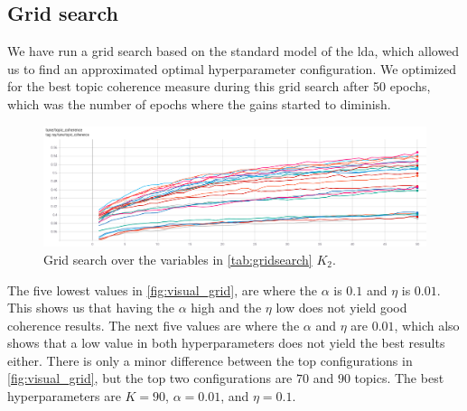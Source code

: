 \subsection{Grid search}\label{sec:appendix_grid_search}
We have run a grid search based on the standard model of the \gls{lda}, which allowed us to find an approximated optimal hyperparameter configuration.
We optimized for the best topic coherence measure during this grid search after 50 epochs, which was the number of epochs where the gains started to diminish.
\begin{figure}
	\includegraphics[width=\textwidth]{figures/gridsearch.png}
	\caption{Grid search over the variables in \autoref{tab:gridsearch} $K_2$.}
	\label{fig:visual_grid}
\end{figure} 
The five lowest values in \autoref{fig:visual_grid}, are where the $\alpha$ is $0.1$ and $\eta$ is $0.01$. 
This shows us that having the $\alpha$ high and the $\eta$ low does not yield good coherence results.
The next five values are where the $\alpha$ and $\eta$ are $0.01$, which also shows that a low value in both hyperparameters does not yield the best results either.
There is only a minor difference between the top configurations in \autoref{fig:visual_grid}, but the top two configurations are $70$ and $90$ topics.
The best hyperparameters are $K = 90$, $\alpha = 0.01$, and $\eta = 0.1$.
